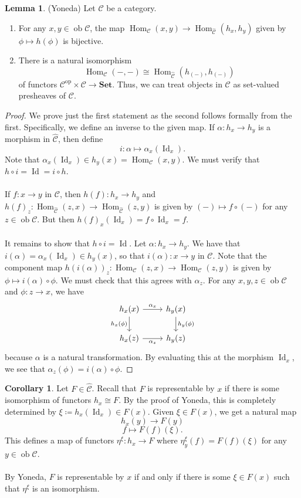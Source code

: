 \documentclass[10pt,letterpaper,cm]{nupset}
\theoremstyle{definition}
\theoremstyle{theorem}
\newtheorem{lemma}[definition]{Lemma}
\newtheorem{corollary}[definition]{Corollary}
\theoremstyle{remark}
\newcommand{\1}{\mathbf{1}}
\renewcommand{\c}{\mathscr{C}}
\newcommand{\0}{\vec 0}
\DeclareMathOperator{\id}{Id}
\DeclareMathOperator{\op}{op}
\DeclareMathOperator{\ob}{ob}
\DeclareMathOperator{\Hom}{Hom}
\begin{document}
\begin{lemma}{(Yoneda)} Let $\c$ be a category.
\begin{enumerate}
\item For any $x, y \in \ob \c$, the map $\Hom_{\c}(x, y) \to \Hom_{\widehat{\c}}(h_x, h_y)$ given by $\phi \mapsto h(\phi)$ is bijective.
\item There is a natural isomorphism $$\Hom_{\c}(-, -) \cong \Hom_{\widehat{\c}}(h_{(-)}, h_{(-)})$$ of functors $ \c^{\op} \times \c \to \mathbf{Set}$. Thus, we can treat objects in $\c$ as set-valued presheaves of $\c$.
\end{enumerate}
\end{lemma}
\begin{proof}
We prove just the first statement as the second follows formally from the first.
Specifically, we define an inverse to the given map. If $\alpha : h_x \to h_y$ is a morphism in $\widehat{\c}$, then define $$i : \alpha \mapsto \alpha_x(\id_x).$$ Note that $\alpha_x(\id_x) \in h_y(x) = \Hom_{\c}(x,y)$. We must verify that $h \circ i = \id = i \circ h$.
\\ \\ If $f: x \to y$ in $\c$, then $h(f) : h_x \to h_y$ and $h(f)_z : \Hom_{\widehat{\c}}(z, x) \to \Hom_{\widehat{\c}}(z, y)$ is given by $(-) \mapsto f \circ (-)$ for any $z\in \ob \c$. But then $h(f)_x(\id_x) = f\circ \id_x = f$.
\\ \\ It remains to show that $h \circ i = \id$. Let $\alpha : h_x \to h_y$.  We have that $
i(\alpha) = \alpha_x(\id_x) \in h_y(x)$, so that $i(\alpha) : x \to y$ in $\c$. Note that the component map $h(i(\alpha))_z : \Hom_{\c}(z, x) \to \Hom_{\c}(z, y)$ is given by $\phi \mapsto i(\alpha) \circ \phi.$ We must check that this agrees with $\alpha_z$. For any $x, y, z \in \ob \c$ and $\phi : z \to x$, we have
\[
\begin{tikzcd}
h_x(x) \arrow[r, "\alpha_x"] \arrow[d, "h_x(\phi)"'] & h_y(x) \arrow[d, "h_y(\phi)"] \\
h_x(z) \arrow[r, "\alpha_z"'] & h_y(z)
\end{tikzcd}
\]
because $\alpha$ is a natural transformation. By evaluating this at the morphism $\id_x$, we see that $\alpha_z(\phi) = i(\alpha) \circ \phi$.
\end{proof}

\begin{corollary}
Let $F \in \widehat{\c}$. Recall that $F$ is representable by $x$ if there is some isomorphism of functors $h_x \cong F$. By the proof of Yoneda, this is completely determined by $\xi\coloneqq h_x(\id_x) \in F(x)$. Given $\xi \in F(x)$, we get a natural map $$h_x(y) \to F(y)$$ $$ f \mapsto F(f)(\xi).$$ This defines a map of functors $\eta^{\xi} : h_x \to F$ where $\eta^{\xi}_y(f) = F(f)(\xi)$ for any $y \in \ob \c$. 
\\ \\ By Yoneda, $F$ is representable by $x$ if and only if there is some $\xi \in F(x)$ such that $\eta^{\xi}$ is an isomorphism. 
\end{corollary}
\end{document}
